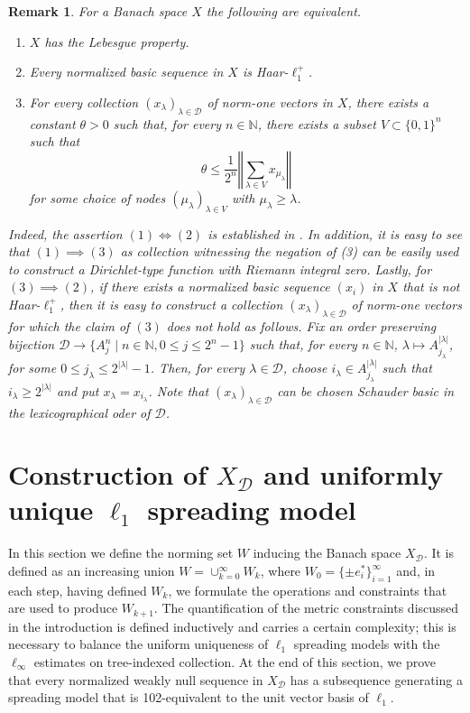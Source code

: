 \documentclass[12pt,a4paper]{amsart}
\newcommand{\N}{\mathbb{N}}
\newcommand{\bes}{\begin{equation*}}
\newcommand{\ees}{\end{equation*}}
\theoremstyle{definition}
\theoremstyle{plain}
\newtheorem{remark}[question]{Remark}
\begin{document}
\begin{remark}
\label{lebesgue on binary trees}
For a Banach space $X$ the following are equivalent.
\begin{enumerate}
    \item $X$ has the Lebesgue property.
    \item Every normalized basic sequence in $X$ is Haar-$\ell_{1}^{+}$.
    \item {For every collection $(x_\lambda)_{\lambda\in\mathcal{D}}$ of norm-one vectors in $X$, there exists a constant $\theta>0$ such that, for every $n\in\mathbb{N}$, there exists a subset $V\subset\{0,1\}^{n}$ such that
\bes\theta\leq \frac{1}{2^{n}}\left\Vert\sum_{\lambda\in V} x_{\mu_{\lambda}}\right\Vert \ees
for some choice of nodes $(\mu_{\lambda})_{\lambda\in V}$ with $\mu_{\lambda}\geq\lambda$.}
\end{enumerate}

Indeed, the assertion $(1)\iff (2)$ is established in \cite{gaebler:sari:2023}. In addition, it is easy to see that $(1)\implies (3)$ as collection witnessing the negation of (3) can be easily used to construct a Dirichlet-type function with Riemann integral zero. Lastly, for $(3)\implies (2)$, if there exists a normalized basic sequence $(x_i)$ in $X$ that is not Haar-$\ell_{1}^{+}$, then it is easy to construct a collection $(x_{\lambda})_{\lambda\in\mathcal{D}}$ of norm-one vectors for which the claim of $(3)$ does not hold as follows. Fix an order preserving bijection $\mathcal{D}\to \{A^n_j\mid n\in\N, 0\leq j\leq 2^n-1\}$ such that, for every $n\in\N$, $\lambda\mapsto A^{|\lambda|}_{j_\lambda}$, for some $0\leq j_\lambda\leq 2^{|\lambda|}-1$. Then, for every $\lambda\in\mathcal{D}$, choose $i_\lambda\in A^{|\lambda|}_{j_\lambda}$ such that $i_\lambda\geq 2^{|\lambda|}$ and put $x_\lambda = x_{i_\lambda}$. Note that $(x_\lambda)_{\lambda\in\mathcal{D}}$ can be chosen Schauder basic in the lexicographical oder of $\mathcal{D}$.
\end{remark}






\section{Construction of $X_\mathcal{D}$ and uniformly unique $\ell_{1}$ spreading model}{\label{sec3}}


In this section we define the norming set $W$ inducing the Banach space $X_\mathcal{D}$. It is defined as an increasing union $W = \cup_{k=0}^\infty W_k$, where $W_0 = \{\pm e_i^*\}_{i=1}^\infty$ and, in each step, having defined $W_k$, we formulate the operations and constraints that are used to produce $W_{k+1}$. The quantification of the metric constraints discussed in the introduction is defined inductively and carries a certain complexity; this is necessary to balance the uniform uniqueness of $\ell_1$ spreading models with the $\ell_\infty$ estimates on tree-indexed collection.  At the end of this section, we prove that every normalized weakly null sequence in $X_\mathcal{D}$ has a subsequence generating a spreading model that is 102-equivalent to the unit vector basis of $\ell_1$.
\end{document}
